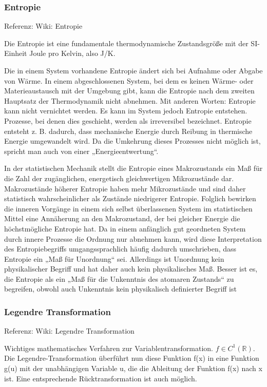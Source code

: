 \documentclass[]{article}
\begin{document}
\subsubsection{Entropie}
Referenz: Wiki: Entropie

Die Entropie ist eine fundamentale thermodynamische Zustandsgröße mit der SI-Einheit Joule pro Kelvin, also J/K.

Die in einem System vorhandene Entropie ändert sich bei Aufnahme oder Abgabe von Wärme. In einem abgeschlossenen System, bei dem es keinen Wärme- oder Materieaustausch mit der Umgebung gibt, kann die Entropie nach dem zweiten Hauptsatz der Thermodynamik nicht abnehmen. Mit anderen Worten: Entropie kann nicht vernichtet werden. Es kann im System jedoch Entropie entstehen. Prozesse, bei denen dies geschieht, werden als irreversibel bezeichnet. Entropie entsteht z. B. dadurch, dass mechanische Energie durch Reibung in thermische Energie umgewandelt wird. Da die Umkehrung dieses Prozesses nicht möglich ist, spricht man auch von einer „Energieentwertung“.

In der statistischen Mechanik stellt die Entropie eines Makrozustands ein Maß für die Zahl der zugänglichen, energetisch gleichwertigen Mikrozustände dar. Makrozustände höherer Entropie haben mehr Mikrozustände und sind daher statistisch wahrscheinlicher als Zustände niedrigerer Entropie. Folglich bewirken die inneren Vorgänge in einem sich selbst überlassenen System im statistischen Mittel eine Annäherung an den Makrozustand, der bei gleicher Energie die höchstmögliche Entropie hat. Da in einem anfänglich gut geordneten System durch innere Prozesse die Ordnung nur abnehmen kann, wird diese Interpretation des Entropiebegriffs umgangssprachlich häufig dadurch umschrieben, dass Entropie ein „Maß für Unordnung“ sei. Allerdings ist Unordnung kein physikalischer Begriff und hat daher auch kein physikalisches Maß. Besser ist es, die Entropie als ein „Maß für die Unkenntnis des atomaren Zustands“ zu begreifen, obwohl auch Unkenntnis kein physikalisch definierter Begriff ist

\subsubsection{Legendre Transformation}
Referenz: Wiki: Legendre Transformation

Wichtiges  mathematisches Verfahren zur Variablentransformation. $f \in C^1(\mathbb{R})$. Die Legendre-Transformation überführt nun diese Funktion f(x) in eine Funktion g(u) mit der unabhängigen Variable u, die die Ableitung der Funktion f(x) nach x ist. Eine entsprechende Rücktransformation ist auch möglich.
\end{document}
